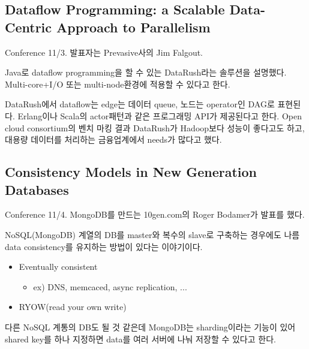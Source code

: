 \documentclass[11pt]{article}
\begin{document}


\subsection{Dataflow Programming: a Scalable
  Data-Centric Approach to Parallelism}

Conference 11/3. 발표자는 Prevasive사의 Jim Falgout.
 
Java로 dataflow programming을 할 수 있는 DataRush라는 솔루션을 설명했다.
Multi-core+I/O 또는 multi-node환경에 적용할 수 있다고 한다.
 
DataRush에서 dataflow는 edge는 데이터 queue, 노드는 operator인 DAG로 표현된다.
Erlang이나 Scala의 actor패턴과 같은 프로그래밍 API가 제공된다고 한다.
Open cloud consortium의 벤치 마킹 결과 DataRush가 Hadoop보다 성능이 좋다고도
하고, 대용량 데이터를 처리하는 금융업계에서 needs가 많다고 했다.
 
 
\subsection{Consistency Models in New Generation Databases}
Conference 11/4. MongoDB를 만드는 10gen.com의 Roger Bodamer가 발표를 했다.
 
NoSQL(MongoDB) 계열의 DB를 master와 복수의 slave로 구축하는 경우에도
나름 data consistency를 유지하는 방법이 있다는 이야기이다.
 
\begin{itemize}
\item Eventually consistent
    \begin{itemize}
    \item ex) DNS, memcaced, async replication, ...
    \end{itemize}
\item RYOW(read your own write)
\end{itemize}
 
다른 NoSQL 계통의 DB도 될 것 같은데 MongoDB는 sharding이라는 기능이
있어 shared key를 하나 지정하면 data를 여러 서버에 나눠 저장할 수
있다고 한다.
\end{document}
